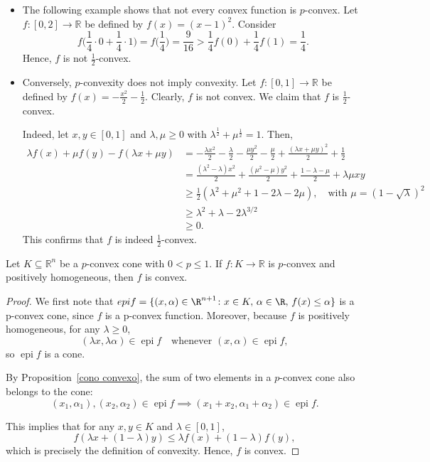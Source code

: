\documentclass[10pt]{article}
\begin{document}
\begin{remark}
\begin{itemize}
\item[$(a)$] The following example shows that not every convex function is $p$-convex.  
Let $f : [0,2] \to \mathbb{R}$ be defined by $f(x) = (x-1)^2$. Consider
\[
f\Big(\frac{1}{4} \cdot 0 + \frac{1}{4} \cdot 1\Big) = f\Big(\frac{1}{4}\Big) = \frac{9}{16} > \frac{1}{4} f(0) + \frac{1}{4} f(1) = \frac{1}{4}.
\]
Hence, $f$ is not $\frac{1}{2}$-convex.

\item[$(b)$] Conversely, $p$-convexity does not imply convexity.  
Let $f : [0,1] \to \mathbb{R}$ be defined by $f(x) = -\frac{x^2}{2} - \frac{1}{2}$. Clearly, $f$ is not convex. We claim that $f$ is $\frac{1}{2}$-convex.  

Indeed, let $x,y \in [0,1]$ and $\lambda, \mu \ge 0$ with $\lambda^{\frac{1}{2}} + \mu^{\frac{1}{2}} = 1$. Then,
\[
\begin{aligned}
\lambda f(x) + \mu f(y) - f(\lambda x + \mu y) 
&= -\frac{\lambda x^2}{2} - \frac{\lambda}{2} - \frac{\mu y^2}{2} - \frac{\mu}{2} + \frac{(\lambda x + \mu y)^2}{2} + \frac{1}{2} \\
&= \frac{(\lambda^2 - \lambda)x^2}{2} + \frac{(\mu^2 - \mu)y^2}{2} + \frac{1 - \lambda - \mu}{2} + \lambda \mu xy \\
&\ge \frac{1}{2}(\lambda^2 + \mu^2 + 1 - 2\lambda - 2\mu), \quad \text{with } \mu = (1-\sqrt{\lambda})^2 \\
&\ge \lambda^2 + \lambda - 2\lambda^{3/2} \\
&\ge 0.
\end{aligned}
\]
This confirms that $f$ is indeed $\frac{1}{2}$-convex.
\end{itemize}
\label{remark:comparison_examples}    
\end{remark}
\begin{theorem}
Let $K \subseteq \mathbb{R}^{n}$ be a $p$-convex cone with $0 < p \le 1$.  
If $f: K \to \mathbb{R}$ is $p$-convex and positively homogeneous, then $f$ is convex.
\end{theorem}
\begin{proof}
We first note that $epif=\{(x,\alpha)\in \R^{n+1}\colon x\in K,\, \alpha\in \R,\, f(x)\leq \alpha\}$  is a p-convex cone, since $f$ is a p-convex function.
Moreover, because $f$ is positively homogeneous, for any $\lambda \ge 0$,
\[
(\lambda x, \lambda \alpha) \in \operatorname{epi} f \quad \text{whenever } (x,\alpha) \in \operatorname{epi} f,
\]
so $\operatorname{epi} f$ is a cone.

By Proposition~\ref{cono convexo}, the sum of two elements in a $p$-convex cone also belongs to the cone:
\[
(x_1, \alpha_1), (x_2, \alpha_2) \in \operatorname{epi} f \implies (x_1+x_2, \alpha_1+\alpha_2) \in \operatorname{epi} f.
\]

This implies that for any $x, y \in K$ and $\lambda \in [0,1]$,
\[
f(\lambda x + (1-\lambda)y) \le \lambda f(x) + (1-\lambda) f(y),
\]
which is precisely the definition of convexity. Hence, $f$ is convex.
\end{proof}
\end{document}
